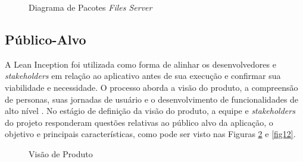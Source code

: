\begin{figure}[h!]
	\centering
	\caption{Diagrama de Pacotes \textit{Files Server}}
	\label{fig10}
\end{figure}

\subsection{Público-Alvo}
\label{Publico-Alvo}
A Lean Inception foi utilizada como forma de alinhar os desenvolvedores e \textit{stakeholders} em relação ao aplicativo antes de sua execução e confirmar sua viabilidade e necessidade. O processo aborda a visão do produto, a compreensão de personas, suas jornadas de usuário e 
o desenvolvimento de funcionalidades de alto nível \cite{lean}. No estágio de definição da visão do produto, a equipe e \textit{stakeholders} do projeto responderam questões relativas ao público alvo da aplicação, o objetivo e principais características, como pode ser visto nas 
Figuras \ref{fig11} e \ref{fig12}. 

\begin{figure}[h!]
	\centering
	\caption{Visão de Produto}
	\label{fig11}
\end{figure}

